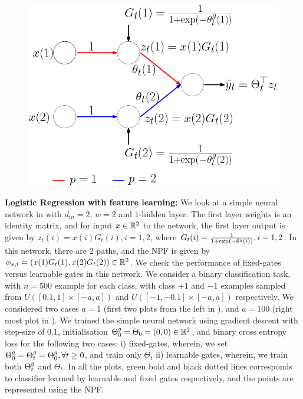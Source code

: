 \begin{figure}
\includegraphics[scale=0.14]{figs/featlearn.png}
\caption{\label{fig:net}}
\end{figure}
\textbf{Logistic Regression with feature learning:} We look at a simple neural network in  with $d_{in}=2$, $w=2$ and $1$-hidden layer. The first layer weights is an identity matrix, and for input $x\in\mathbb{R}^2$ to the network, the first layer output is given by $z_{t}(i)=x(i)G_t(i),i=1,2$, where $G_t(i)=\frac{1}{1+\exp(-\theta^g(i))},i=1,2$. In this network, there are $2$ paths, and the NPF is given by $\phi_{x,t}=(x(1)G_t(1),x(2)G_t(2))\in \mathbb{R}^2$. We check the performance of fixed-gates versus learnable gates in this network. We consider a binary classification task, with $n=500$ example for each class, with class $+1$ and $-1$  examples sampled from $U([0.1,1]\times [-a,a])$ and $U([-1,-0.1]\times[-a,a])$ respectively. \WFclear We considered two cases $a=1$ (first two plots from the left in ), and $a=100$ (right most plot in ). 
We trained the simple neural network using gradient descent with step-size of $0.1$, initialisation ${\Theta}^g_0=\Theta_0=(0,0)\in\mathbb{R}^2$, and binary cross entropy loss for the following two cases: i) fixed-gates, wherein, we set ${\Theta}^g_0={\Theta}^g_t={\Theta}^g_0,\forall t\geq 0$, and train only $\Theta_t$ ii) learnable gates, wherein, we train both ${\Theta}^g_t$ and $\Theta_t$. In all the plots, green bold and black dotted lines corresponds to classifier learned  by learnable and fixed gates respectively, and the points are represented using the NPF.\\

